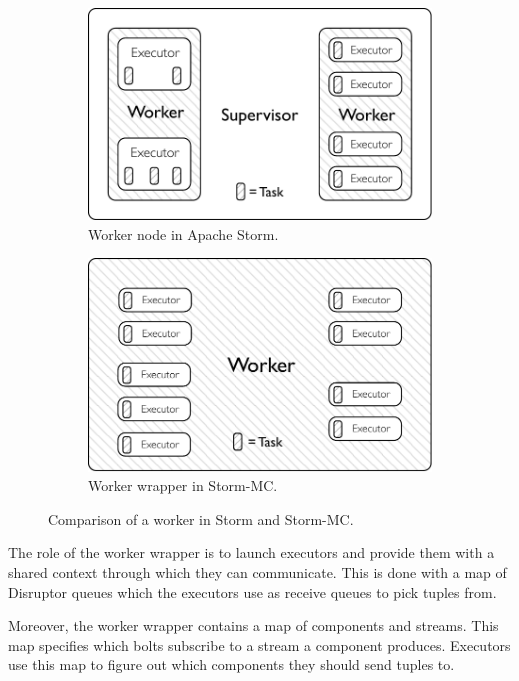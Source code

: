 \documentclass[bsc,deptreport,twoside,singlespacing,normalheadings,parskip]{infthesis}\usepackage[]{graphicx}\usepackage[]{color}
\begin{document}
\begin{figure}[!htb]
\centering
\begin{subfigure}{.5\textwidth}
  \centering
  \includegraphics[width=0.95\linewidth]{pdf/distributed_worker.pdf}
  \caption{Worker node in Apache Storm.}
  \label{fig:comparison1}
\end{subfigure}\begin{subfigure}{.5\textwidth}
  \centering
  \includegraphics[width=0.95\linewidth]{pdf/local_worker.pdf}
  \caption{Worker wrapper in Storm-MC.}
  \label{fig:comparison2}
\end{subfigure}
\caption{Comparison of a worker in Storm and Storm-MC.}
\label{fig:comparison}
\end{figure}

The role of the worker wrapper is to launch executors and provide them with a shared context through which they can communicate. This is done with a map of Disruptor queues which the executors use as receive queues to pick tuples from.

Moreover, the worker wrapper contains a map of components and streams. This map specifies which bolts subscribe to a stream a component produces. Executors use this map to figure out which components they should send tuples to.
\end{document}
